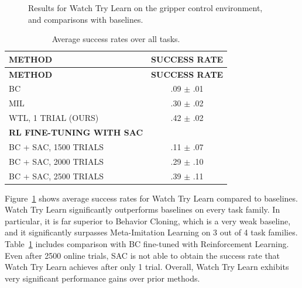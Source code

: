 \documentclass[
  letterpaper,
  numbers=noenddot,
  DIV=11]{scrreprt}
\theoremstyle{definition}
\theoremstyle{plain}
\theoremstyle{plain}
\theoremstyle{remark}
\begin{document}
\begin{figure}


\caption{\label{fig-watch-try-learn-results}Results for Watch Try Learn
on the gripper control environment, and comparisons with baselines.}

\end{figure}%

\begin{longtable}[]{@{}lc@{}}
\caption{Average success rates over all
tasks.}\label{tbl-watch-try-learn-table}\tabularnewline
\toprule\noalign{}
\textbf{METHOD} & \textbf{SUCCESS RATE} \\
\midrule\noalign{}
\endfirsthead
\toprule\noalign{}
\textbf{METHOD} & \textbf{SUCCESS RATE} \\
\midrule\noalign{}
\endhead
\bottomrule\noalign{}
\endlastfoot
BC & .09 \(\pm\) .01 \\
MIL & .30 \(\pm\) .02 \\
WTL, 1 TRIAL (OURS) & .42 \(\pm\) .02 \\
\textbf{RL FINE-TUNING WITH SAC} & \\
BC + SAC, 1500 TRIALS & .11 \(\pm\) .07 \\
BC + SAC, 2000 TRIALS & .29 \(\pm\) .10 \\
BC + SAC, 2500 TRIALS & .39 \(\pm\) .11 \\
\end{longtable}

Figure~\ref{fig-watch-try-learn-results} shows average success rates for
Watch Try Learn compared to baselines. Watch Try Learn significantly
outperforms baselines on every task family. In particular, it is far
superior to Behavior Cloning, which is a very weak baseline, and it
significantly surpasses Meta-Imitation Learning on 3 out of 4 task
families. Table~\ref{tbl-watch-try-learn-table} includes comparison with
BC fine-tuned with Reinforcement Learning. Even after 2500 online
trials, SAC is not able to obtain the success rate that Watch Try Learn
achieves after only 1 trial. Overall, Watch Try Learn exhibits very
significant performance gains over prior methods.
\end{document}
